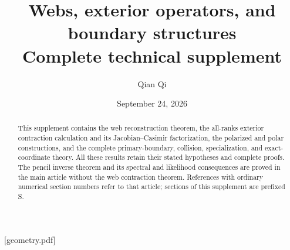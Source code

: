
[geometry.pdf]
\renewcommand{\thesection}{S\arabic{section}}

\title[Webs, operators, and boundary structures]{Webs, exterior operators, and boundary structures\\Complete technical supplement}
\author{Qian Qi}
\date{September 24, 2026}
\begin{abstract}
This supplement contains the web reconstruction theorem, the all-ranks
exterior contraction calculation and its Jacobian--Casimir factorization,
the polarized and polar constructions, and the complete primary-boundary,
collision, specialization, and exact-coordinate theory.  All these
results retain their stated hypotheses and complete proofs.  The pencil
inverse theorem and its spectral and likelihood consequences are proved
in the main article without the web contraction theorem.  References
with ordinary numerical section numbers refer to that article; sections
of this supplement are prefixed S.
\end{abstract}
\maketitle
\tableofcontents






























